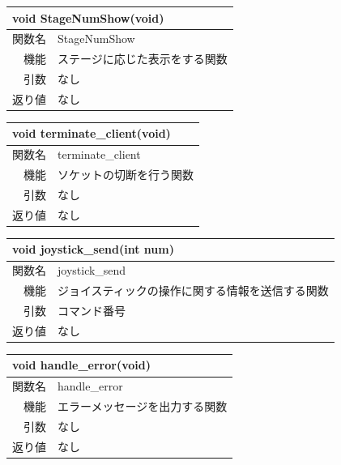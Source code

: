 \documentclass{jarticle}
\begin{document}
\begin{table}[H]
\begin{tabular}{|r|l|}
\hline
\multicolumn{2}{|l|}{void StageNumShow(void)}       \\ \hline
関数名           & StageNumShow \\ \hline
機能     & ステージに応じた表示をする関数 \\
引数     & なし \\
返り値   & なし \\ \hline
\end{tabular}
\end{table}

\begin{table}[H]
\begin{tabular}{|r|l|}
\hline
\multicolumn{2}{|l|}{void terminate\_client(void)}       \\ \hline
関数名           & terminate\_client \\ \hline
機能     & ソケットの切断を行う関数 \\
引数     & なし \\
返り値   & なし \\ \hline
\end{tabular}
\end{table}


\begin{table}[H]
\begin{tabular}{|r|l|}
\hline
\multicolumn{2}{|l|}{void joystick\_send(int num)}       \\ \hline
関数名           & joystick\_send \\ \hline
機能     & ジョイスティックの操作に関する情報を送信する関数 \\
引数     & コマンド番号 \\
返り値   & なし \\ \hline
\end{tabular}
\end{table}


\begin{table}[H]
\begin{tabular}{|r|l|}
\hline
\multicolumn{2}{|l|}{void handle\_error(void)}       \\ \hline
関数名           & handle\_error \\ \hline
機能     & エラーメッセージを出力する関数 \\
引数     & なし \\
返り値   & なし \\ \hline
\end{tabular}
\end{table}
\end{document}
